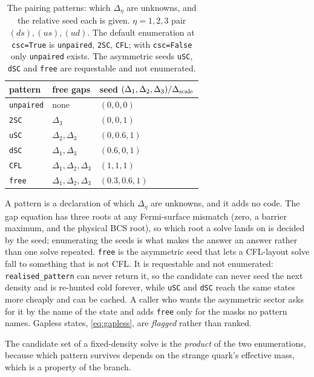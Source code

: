 \documentclass[11pt,a4paper]{article}
\newcommand{\code}[1]{\texttt{#1}}
\begin{document}
\begin{table}[h]
\centering
\caption{The pairing patterns: which $\Delta_\eta$ are unknowns, and the
relative seed each is given. $\eta=1,2,3$ pair $(ds),(us),(ud)$. The default
enumeration at \code{csc=True} is \code{unpaired}, \code{2SC}, \code{CFL};
with \code{csc=False} only \code{unpaired} exists. The asymmetric seeds
\code{uSC}, \code{dSC} and \code{free} are requestable and not enumerated.}
\label{tab:patterns}
\begin{tabular}{lll}
\toprule
pattern & free gaps & seed $(\Delta_1,\Delta_2,\Delta_3)/\Delta_{\rm scale}$ \\
\midrule
\code{unpaired} & none                     & $(0,0,0)$ \\
\code{2SC}      & $\Delta_3$               & $(0,0,1)$ \\
\code{uSC}      & $\Delta_2,\Delta_3$      & $(0,0.6,1)$ \\
\code{dSC}      & $\Delta_1,\Delta_3$      & $(0.6,0,1)$ \\
\code{CFL}      & $\Delta_1,\Delta_2,\Delta_3$ & $(1,1,1)$ \\
\code{free}     & $\Delta_1,\Delta_2,\Delta_3$ & $(0.3,0.6,1)$ \\
\bottomrule
\end{tabular}
\end{table}

A pattern is a declaration of which $\Delta_\eta$ are unknowns, and it adds no
code. The gap equation has three roots at any Fermi-surface mismatch (zero, a
barrier maximum, and the physical BCS root), so which root a solve lands on is
decided by the seed; enumerating the seeds is what makes the answer an answer
rather than one solve repeated. \code{free} is the asymmetric seed that lets a
CFL-layout solve fall to something that is not CFL. It is requestable and not
enumerated: \code{realised\_pattern} can never return it, so the candidate can
never seed the next density and is re-hunted cold forever, while \code{uSC}
and \code{dSC} reach the same states more cheaply and can be cached. A caller
who wants the asymmetric sector asks for it by the name of the state and adds
\code{free} only for the masks no pattern names. Gapless states,
\eqref{eq:gapless}, are \emph{flagged} rather than ranked.

The candidate set of a fixed-density solve is the \emph{product} of the two
enumerations, because which pattern survives depends on the strange quark's
effective mass, which is a property of the branch.
\end{document}

